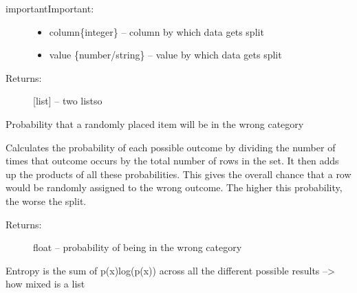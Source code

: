 \documentclass[letterpaper,10pt,english]{sphinxmanual}
\begin{document}
\begin{sphinxadmonition}{important}{Important:}
\begin{fulllineitems}
\begin{description}
\begin{itemize}
\item {} 
column\{integer\} -- column by which data gets split

\item {} 
value \{number/string\} -- value by which data gets split

\end{itemize}

\item[{Returns:}] \leavevmode
{[}list{]} -- two listso

\end{description}

\end{fulllineitems}

\label{\detokenize{DT:giniimpurity}}

\begin{fulllineitems}
\label{\detokenize{DT:ForestFire.Main.giniimpurity}}
Probability that a randomly placed item will be in the wrong category

Calculates the probability of each possible outcome by dividing the number of times that outcome occurs
by the total number of rows in the set.
It then adds up the products of all these probabilities.
This gives the overall chance that a row would be randomly assigned to the wrong outcome.
The higher this probability, the worse the split.
\begin{description}
\item[{Returns:}] \leavevmode
float -- probability of being in the wrong category

\end{description}

\end{fulllineitems}

\label{\detokenize{DT:entropy}}

\begin{fulllineitems}
\label{\detokenize{DT:ForestFire.Main.entropy}}
Entropy is the sum of p(x)log(p(x)) across all the different possible results --\textgreater{} how mixed is a list


\end{fulllineitems}
\end{sphinxadmonition}
\end{document}
